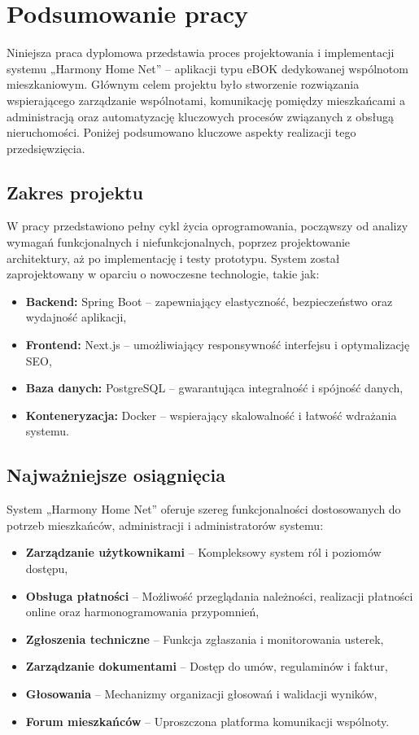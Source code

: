 \chapter{Podsumowanie pracy}

Niniejsza praca dyplomowa przedstawia proces projektowania i implementacji systemu „Harmony Home Net” – aplikacji typu eBOK dedykowanej wspólnotom mieszkaniowym. Głównym celem projektu było stworzenie rozwiązania wspierającego zarządzanie wspólnotami, komunikację pomiędzy mieszkańcami a administracją oraz automatyzację kluczowych procesów związanych z obsługą nieruchomości. Poniżej podsumowano kluczowe aspekty realizacji tego przedsięwzięcia.

\section{Zakres projektu}
W pracy przedstawiono pełny cykl życia oprogramowania, począwszy od analizy wymagań funkcjonalnych i niefunkcjonalnych, poprzez projektowanie architektury, aż po implementację i testy prototypu. System został zaprojektowany w oparciu o nowoczesne technologie, takie jak:
\begin{itemize}
    \item \textbf{Backend:} Spring Boot – zapewniający elastyczność, bezpieczeństwo oraz wydajność aplikacji,
    \item \textbf{Frontend:} Next.js – umożliwiający responsywność interfejsu i optymalizację SEO,
    \item \textbf{Baza danych:} PostgreSQL – gwarantująca integralność i spójność danych,
    \item \textbf{Konteneryzacja:} Docker – wspierający skalowalność i łatwość wdrażania systemu.
\end{itemize}

\section{Najważniejsze osiągnięcia}
System „Harmony Home Net” oferuje szereg funkcjonalności dostosowanych do potrzeb mieszkańców, administracji i administratorów systemu:
\begin{itemize}
    \item \textbf{Zarządzanie użytkownikami} -- Kompleksowy system ról i poziomów dostępu,
    \item \textbf{Obsługa płatności} -- Możliwość przeglądania należności, realizacji płatności online oraz harmonogramowania przypomnień,
    \item \textbf{Zgłoszenia techniczne} -- Funkcja zgłaszania i monitorowania usterek,
    \item \textbf{Zarządzanie dokumentami} -- Dostęp do umów, regulaminów i faktur,
    \item \textbf{Głosowania} -- Mechanizmy organizacji głosowań i walidacji wyników,
    \item \textbf{Forum mieszkańców} -- Uproszczona platforma komunikacji wspólnoty.
\end{itemize}


